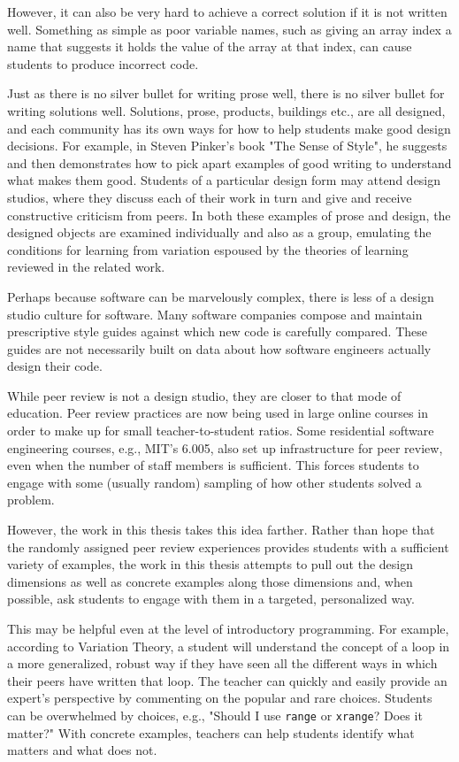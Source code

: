However, it can also be very hard to achieve a correct solution if it is not written well. Something as simple as poor variable names, such as giving an array index a name that suggests it holds the value of the array at that index, can cause students to produce incorrect code.

Just as there is no silver bullet for writing prose well, there is no silver bullet for writing solutions well. Solutions, prose, products, buildings etc., are all designed, and each community has its own ways for how to help students make good design decisions. For example, in Steven Pinker's book "The Sense of Style", he suggests and then demonstrates how to pick apart examples of good writing to understand what makes them good. Students of a particular design form may attend design studios, where they discuss each of their work in turn and give and receive constructive criticism from peers. In both these examples of prose and design, the designed objects are examined individually and also as a group, emulating the conditions for learning from variation espoused by the theories of learning reviewed in the related work. 

Perhaps because software can be marvelously complex, there is less of a design studio culture for software. Many software companies compose and maintain prescriptive style guides against which new code is carefully compared. These guides are not necessarily built on data about how software engineers actually design their code. 

While peer review is not a design studio, they are closer to that mode of education. Peer review practices are now being used in large online courses in order to make up for small teacher-to-student ratios. Some residential software engineering courses, e.g., MIT's 6.005, also set up infrastructure for peer review, even when the number of staff members is sufficient. This forces students to engage with some (usually random) sampling of how other students solved a problem. 

However, the work in this thesis takes this idea farther. Rather than hope that the randomly assigned peer review experiences provides students with a sufficient variety of examples, the work in this thesis attempts to pull out the design dimensions as well as concrete examples along those dimensions and, when possible, ask students to engage with them in a targeted, personalized way. 

This may be helpful even at the level of introductory programming. For example, according to Variation Theory, a student will understand the concept of a loop in a more generalized, robust way if they have seen all the different ways in which their peers have written that loop. The teacher can quickly and easily provide an expert's perspective by commenting on the popular and rare choices. Students can be overwhelmed by choices, e.g., "Should I use \texttt{range} or \texttt{xrange}? Does it matter?" With concrete examples, teachers can help students identify what matters and what does not. 

